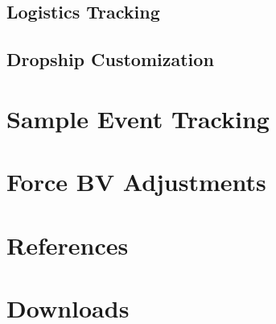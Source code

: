 \documentclass{article}
\newcommand{\mysectiontitle}{}
\newcommand{\newsection}[2]{\renewcommand{\mysectiontitle}{#2}\section{#1}}
\begin{document}


\subsection{Logistics Tracking}



\subsection{Dropship Customization}



\newpage

\newsection{Sample Event Tracking}{sample-tracking-event}



\newpage

\newsection{Force BV Adjustments}{bv-adjustments}
\label{sec:force_bv_adjustments}



\newpage

\newsection{References}{references}
\label{sec:references}



\newpage


\newsection{Downloads}{downloads}
\label{sec:downloads}



\newpage
\end{document}
